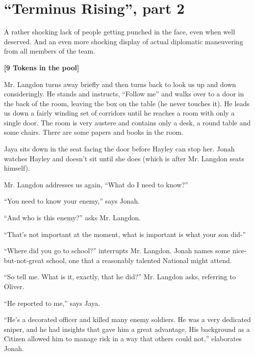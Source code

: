 \setcounter{chapter}{ 27 }
\chapter{\textbf{``Terminus Rising'', part 2} }






A rather shocking lack of people getting punched in the face, even when well deserved.  And an even more shocking display of actual diplomatic maneuvering from all members of the team.






\textbf{{[}9 Tokens in the pool{]}}



Mr. Langdon turns away briefly and then turns back to look us up and down consideringly.  He stands and instructs, ``Follow me'' and walks over to a door in the back of the room, leaving the box on the table (he never touches it).  He leads us down a fairly winding set of corridors until he reaches a room with only a single door.  The room is very austere and contains only a desk, a round table and some chairs.  There are some papers and books in the room.



Jaya sits down in the seat facing the door before Hayley can stop her.  Jonah watches Hayley and doesn't sit until she does (which is after Mr. Langdon seats himself).



Mr. Langdon addresses us again, ``What do I need to know?''

``You need to know your enemy,'' says Jonah.

``And who is this enemy?'' asks Mr. Langdon.

``That's not important at the moment, what is important is what your son did-''

``Where did you go to school?'' interrupts Mr. Langdon.  Jonah names some nice-but-not-great school, one that a reasonably talented National might attend.

``So tell me.  What is it, exactly, that he did?'' Mr. Langdon asks, referring to Oliver.

``He reported to me,'' says Jaya.

``He's a decorated officer and killed many enemy soldiers.  He was a very dedicated sniper, and he had insights that gave him a great advantage. His background as a Citizen allowed him to manage risk in a way that others could not,'' elaborates Jonah.

